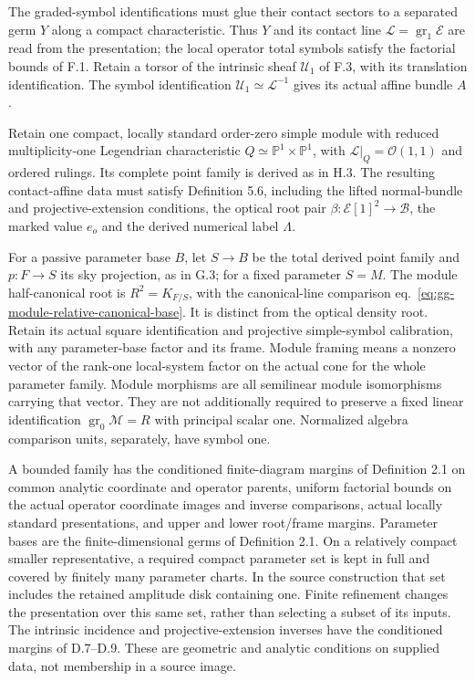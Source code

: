 \documentclass[
  english,
  11pt,
  reqno]{amsart}
\begin{document}
The graded-symbol identifications must glue their contact sectors to a
separated germ \(Y\) along a compact characteristic. Thus \(Y\) and its
contact line \(\mathcal L=\operatorname{gr}_1\mathcal E\) are read from
the presentation; the local operator total symbols satisfy the factorial
bounds of F.1. Retain a torsor of the intrinsic sheaf \(\mathscr U_1\)
of F.3, with its translation identification. The symbol identification
\(\mathscr U_1\simeq\mathcal L^{-1}\) gives its actual affine bundle
\(A\).

Retain one compact, locally standard order-zero simple module with
reduced multiplicity-one Legendrian characteristic
\(Q\simeq\mathbb P^1\times\mathbb P^1\), with
\(\mathcal L|_Q=\mathcal O(1,1)\) and ordered rulings. Its complete
point family is derived as in H.3. The resulting contact-affine data
must satisfy Definition 5.6, including the lifted normal-bundle and
projective-extension conditions, the optical root pair
\(\beta:\mathcal E[1]^2\to\mathcal B\), the marked value \(e_o\) and the
derived numerical label \(\Lambda\).

For a passive parameter base \(B\), let \(S\to B\) be the total derived
point family and \(p:F\to S\) its sky projection, as in G.3; for a fixed
parameter \(S=M\). The module half-canonical root is \(R^2=K_{F/S}\),
with the canonical-line comparison
eq.~\ref{eq:gg-module-relative-canonical-base}. It is distinct from the
optical density root. Retain its actual square identification and
projective simple-symbol calibration, with any parameter-base factor and
its frame. Module framing means a nonzero vector of the rank-one
local-system factor on the actual cone for the whole parameter family.
Module morphisms are all semilinear module isomorphisms carrying that
vector. They are not additionally required to preserve a fixed linear
identification \(\operatorname{gr}_0\mathcal M=R\) with principal scalar
one. Normalized algebra comparison units, separately, have symbol one.

A bounded family has the conditioned finite-diagram margins of
Definition 2.1 on common analytic coordinate and operator parents,
uniform factorial bounds on the actual operator coordinate images and
inverse comparisons, actual locally standard presentations, and upper
and lower root/frame margins. Parameter bases are the finite-dimensional
germs of Definition 2.1. On a relatively compact smaller representative,
a required compact parameter set is kept in full and covered by finitely
many parameter charts. In the source construction that set includes the
retained amplitude disk containing one. Finite refinement changes the
presentation over this same set, rather than selecting a subset of its
inputs. The intrinsic incidence and projective-extension inverses have
the conditioned margins of D.7--D.9. These are geometric and analytic
conditions on supplied data, not membership in a source image.
\end{document}
